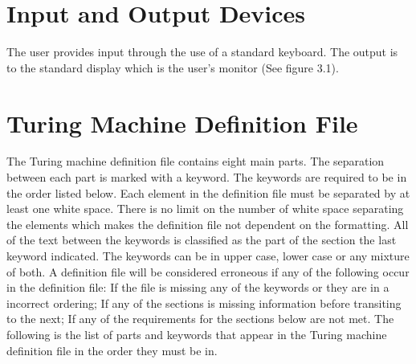 \documentclass{report}
\begin{document}
\section{Input and Output Devices}
The user provides input through the use of a standard keyboard. The output is to the standard display which is the user's monitor (See figure 3.1). 
\section{Turing Machine Definition File}

The Turing machine definition file contains eight main parts. The separation between each part is marked with a keyword. The keywords are required to be in the order listed below. Each element in the definition file must be separated by at least one white space. There is no limit on the number of white space separating the elements which makes the definition file not dependent on the formatting. All of the text between the keywords is classified as the part of the section the last keyword indicated. The keywords can be in upper case, lower case or any mixture of both. A definition file will be considered erroneous if any of the following occur in the definition file: If the file is missing any of the keywords or they are in a incorrect ordering; If any of the sections is missing information before transiting to the next; If any of the requirements for the sections below are not met. The following is the list of parts and keywords that appear in the Turing machine definition file in the order they must be in.
\end{document}
